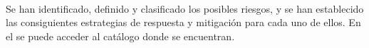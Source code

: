 
\paragraph{} Se han identificado, definido y clasificado los posibles riesgos, y se han establecido las consiguientes estrategias de respuesta y mitigación para cada uno de ellos.
En el  se puede acceder al catálogo donde se encuentran.
